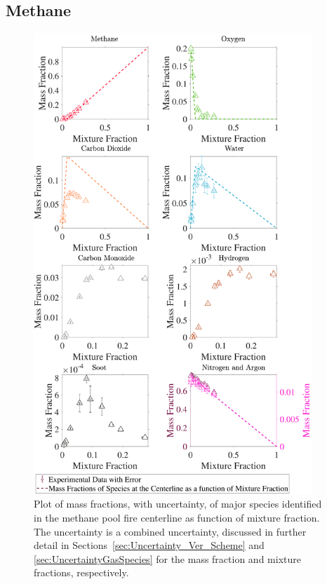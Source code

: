 \documentclass[12pt]{article}
\begin{document}
\subsection{Methane}
\label{ssec:Methane_ALL_Mix_Frac}
\begin{figure}[!h]
	\centering
\includegraphics[width=10.5cm,keepaspectratio]{Methane_Mixture_Fraction_Major_Plot.pdf}
	\caption[Species mass fractions superimposed on methane state relations]{Plot of mass fractions, with uncertainty, of major species identified in the methane pool fire centerline as function of mixture fraction. The uncertainty is a combined uncertainty, discussed in further detail in Sections~\ref{sec:Uncertainty_Ver_Scheme} and \ref{sec:UncertaintyGasSpecies} for the mass fraction and mixture fractions, respectively.}
	\label{fig:Methane_MIX_Frac_Major}
\end{figure}

\pagebreak
\end{document}
